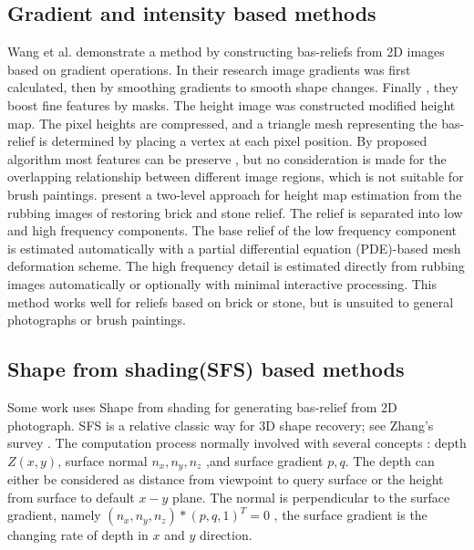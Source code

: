 \subsection{Gradient and intensity based methods}
Wang et al.\cite{wang2010image} demonstrate a method by constructing bas-reliefs from 2D images based on gradient operations. In their research image gradients was first calculated, then by smoothing gradients to smooth shape changes. Finally , they boost fine features by masks.
The height image was constructed modified height map. The pixel heights are compressed, and a triangle mesh representing the bas-relief is determined by placing a vertex at each pixel position. By proposed  algorithm most features can be preserve , but no consideration is made for the overlapping relationship between different image regions, which is not suitable for brush paintings. \newline
\cite{li2012restoration} present a two-level approach for height map estimation from the rubbing images of restoring brick and stone relief.  The relief is separated into low and high frequency components. The base relief of the low frequency component is estimated automatically with a partial differential equation (PDE)-based mesh deformation scheme. The high frequency detail is estimated directly from rubbing images automatically or optionally with minimal interactive processing. This method works well for reliefs based on brick or stone, but is unsuited to general photographs or brush paintings.

\subsection{Shape from shading(SFS) based methods}
Some work uses Shape from shading for generating  bas-relief from 2D photograph. SFS is a relative classic way for 3D shape recovery; see Zhang's survey \cite{zhang1999shape}.  The computation process normally involved with several concepts : depth $Z(x,y)$, surface normal $n_x,n_y,n_z$ ,and surface gradient $p,q$. The depth can either be considered as distance from viewpoint to query surface or the height from surface to default $x-y$ plane. The normal is perpendicular to the surface gradient, namely $\left( n_x,n_y,n_z\right) * \left( p, q ,1\right)^T =0  $ , the surface gradient is the changing rate of depth in $x$ and $y$ direction.

